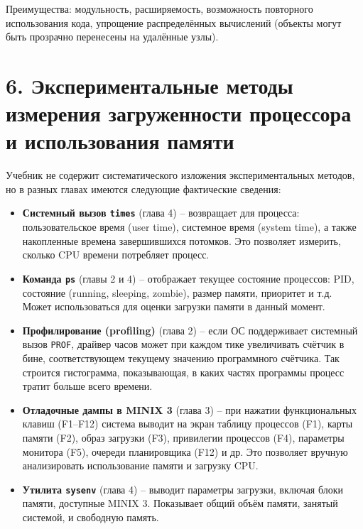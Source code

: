 \documentclass[a4paper,12pt]{article}
\begin{document}
Преимущества: модульность, расширяемость, возможность повторного использования кода, упрощение распределённых вычислений (объекты могут быть прозрачно перенесены на удалённые узлы).

\section*{6. Экспериментальные методы измерения загруженности процессора и использования памяти}

Учебник не содержит систематического изложения экспериментальных методов, но в разных главах имеются следующие фактические сведения:
\begin{itemize}
    \item \textbf{Системный вызов \texttt{times}} (глава 4) – возвращает для процесса: пользовательское время (user time), системное время (system time), а также накопленные времена завершившихся потомков. Это позволяет измерить, сколько CPU времени потребляет процесс.
    \item \textbf{Команда \texttt{ps}} (главы 2 и 4) – отображает текущее состояние процессов: PID, состояние (running, sleeping, zombie), размер памяти, приоритет и т.д. Может использоваться для оценки загрузки памяти в данный момент.
    \item \textbf{Профилирование (profiling)} (глава 2) – если ОС поддерживает системный вызов \texttt{PROF}, драйвер часов может при каждом тике увеличивать счётчик в бине, соответствующем текущему значению программного счётчика. Так строится гистограмма, показывающая, в каких частях программы процесс тратит больше всего времени.
    \item \textbf{Отладочные дампы в MINIX 3} (глава 3) – при нажатии функциональных клавиш (F1–F12) система выводит на экран таблицу процессов (F1), карты памяти (F2), образ загрузки (F3), привилегии процессов (F4), параметры монитора (F5), очереди планировщика (F12) и др. Это позволяет вручную анализировать использование памяти и загрузку CPU.
    \item \textbf{Утилита \texttt{sysenv}} (глава 4) – выводит параметры загрузки, включая блоки памяти, доступные MINIX 3. Показывает общий объём памяти, занятый системой, и свободную память.
\end{itemize}
\end{document}
